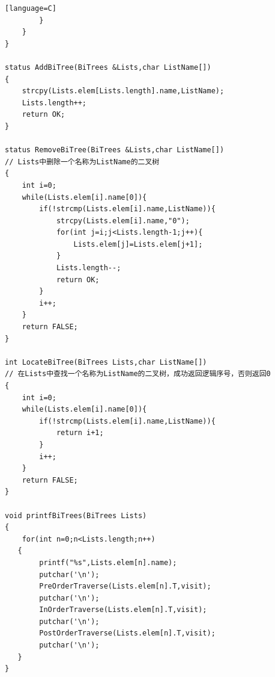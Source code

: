 \documentclass[supercite]{Experimental_Report}
\theoremstyle{definition}
\begin{document}
\begin{sloppypar}
\begin{lstlisting}[breaklines][language=C]
		}	
  	}
}

status AddBiTree(BiTrees &Lists,char ListName[])
{
    strcpy(Lists.elem[Lists.length].name,ListName);
    Lists.length++;
	return OK;
}

status RemoveBiTree(BiTrees &Lists,char ListName[])
// Lists中删除一个名称为ListName的二叉树
{
    int i=0;
    while(Lists.elem[i].name[0]){
        if(!strcmp(Lists.elem[i].name,ListName)){
        	strcpy(Lists.elem[i].name,"0");
            for(int j=i;j<Lists.length-1;j++){
                Lists.elem[j]=Lists.elem[j+1];
            }
            Lists.length--;
            return OK;
        }
        i++;
    }
    return FALSE;
}

int LocateBiTree(BiTrees Lists,char ListName[])
// 在Lists中查找一个名称为ListName的二叉树，成功返回逻辑序号，否则返回0
{
    int i=0;
    while(Lists.elem[i].name[0]){
        if(!strcmp(Lists.elem[i].name,ListName)){
            return i+1;
        }
        i++;
    }
    return FALSE;
}

void printfBiTrees(BiTrees Lists)
{
	for(int n=0;n<Lists.length;n++)
   {
   		printf("%s",Lists.elem[n].name);
		putchar('\n');
   		PreOrderTraverse(Lists.elem[n].T,visit);
		putchar('\n');
		InOrderTraverse(Lists.elem[n].T,visit);
		putchar('\n');
		PostOrderTraverse(Lists.elem[n].T,visit);
        putchar('\n');
   }
}


\end{lstlisting}
\end{sloppypar}
\end{document}
